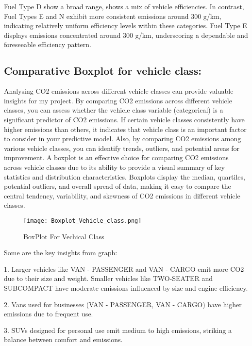 \documentclass[12pt, a4paper,oneside]{book}
\numberwithin{equation}{section}
\begin{document}
\hfill \break
Fuel Type D show a broad range, shows a mix of vehicle efficiencies. In contrast, Fuel Types E and N exhibit more consistent emissions around 300 g/km, indicating relatively uniform efficiency levels within these categories. Fuel Type E  displays emissions concentrated around 300 g/km, underscoring a dependable and foreseeable efficiency pattern.

\newpage

\subsection{Comparative Boxplot for vehicle class:}

Analysing CO2 emissions across different vehicle classes can provide valuable insights for my project. By comparing CO2 emissions across different vehicle classes, you can assess whether the vehicle class variable (categorical) is a significant predictor of CO2 emissions. If certain vehicle classes consistently have higher emissions than others, it indicates that vehicle class is an important factor to consider in your predictive model. Also, by comparing CO2 emissions among various vehicle classes, you can identify trends, outliers, and potential areas for improvement.
A boxplot is an effective choice for comparing CO2 emissions across vehicle classes due to its ability to provide a visual summary of key statistics and distribution characteristics. Boxplots display the median, quartiles, potential outliers, and overall spread of data, making it easy to compare the central tendency, variability, and skewness of CO2 emissions in different vehicle classes.

 \begin{figure}[H]
\centerline{\texttt{[image: Boxplot\_Vehicle\_class.png]}}
\caption{BoxPlot For Vechical Class }
\label{fig:4.2}
\end{figure}
\newpage
Some are the key insights from graph:

1.	Larger vehicles like VAN - PASSENGER and VAN - CARGO emit more CO2 due to their size and weight. Smaller vehicles like TWO-SEATER and SUBCOMPACT have moderate emissions influenced by size and engine efficiency.

2.	Vans used for businesses (VAN - PASSENGER, VAN - CARGO) have higher emissions due to frequent use.

3.	SUVs designed for personal use emit medium to high emissions, striking a balance between comfort and emissions.
\end{document}
